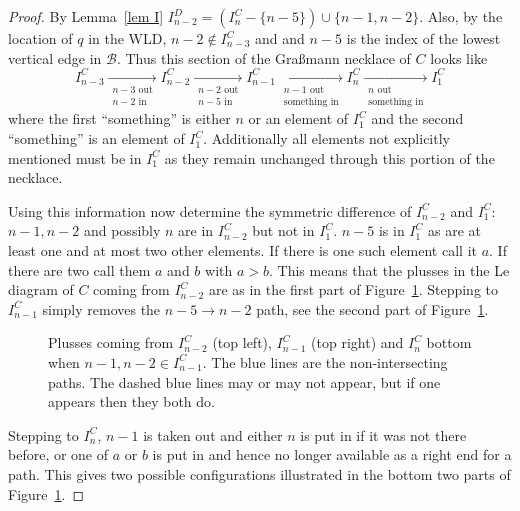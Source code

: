 \documentclass[11pt]{article}
\theoremstyle{remark}
\theoremstyle{definition}
\begin{document}
\begin{proof}
  By Lemma~\ref{lem I} $I_{n-2}^{D}= (I_{n}^{C} - \{n-5\})\cup \{n-1,n-2\}$.  Also, by the location of $q$ in the WLD,  $n-2\not\in I_{n-3}^{C}$ and and $n-5$ is the index of the lowest vertical edge in $\mathcal{B}$.  Thus this section of the Gra\ss mann necklace of $C$ looks like
  \begin{equation}\label{eq necklace}
  I_{n-3}^{C} \underset{\substack{n-3\text{ out}\\n-2\text{ in}}}{\rightarrow} I_{n-2}^{C} \underset{\substack{n-2\text{ out}\\n-5\text{ in}}}{\rightarrow} I_{n-1}^{C} \underset{\substack{n-1\text{ out}\\\text{something in}}}{\rightarrow} I_{n}^{C} \underset{\substack{n \text{ out}\\\text{something in}}}{\rightarrow} I_1^{C}
  \end{equation}
  where the first ``something'' is either $n$ or an element of $I_1^{C}$ and the second ``something'' is an element of $I_1^{C}$.  Additionally all elements not explicitly mentioned must be in $I_1^{C}$ as they remain unchanged through this portion of the necklace.

  Using this information now determine the symmetric difference of $I_{n-2}^{C}$ and $I_1^{C}$: $n-1, n-2$ and possibly $n$ are in $I_{n-2}^{C}$ but not in $I_1^{C}$.  $n-5$ is in $I_1^{C}$ as are at least one and at most two other elements.  If there is one such element call it $a$.  If there are two call them $a$ and $b$ with $a>b$.  This means that the plusses in the Le diagram of $C$ coming from $I_{n-2}^{C}$ are as in the first part of Figure~\ref{fig messy}.  Stepping to $I_{n-1}^{C}$ simply removes the $n-5\rightarrow n-2$ path, see the second part of Figure~\ref{fig messy}.

  \begin{figure}
    \caption{Plusses coming from $I_{n-2}^{C}$ (top left),  $I_{n-1}^{C}$ (top right) and $I_{n}^{C}$ bottom when $n-1, n-2\in I_{n-1}^{C}$.  The blue lines are the non-intersecting paths.  The dashed blue lines may or may not appear, but if one appears then they both do.}\label{fig messy}
  \end{figure}

  Stepping to $I_{n}^{C}$, $n-1$ is taken out and either $n$ is put in if it was not there before, or one of $a$ or $b$ is put in and hence no longer available as a right end for a path.  This gives two possible configurations illustrated in the bottom two parts of Figure~\ref{fig messy}.


\end{proof}
\end{document}
